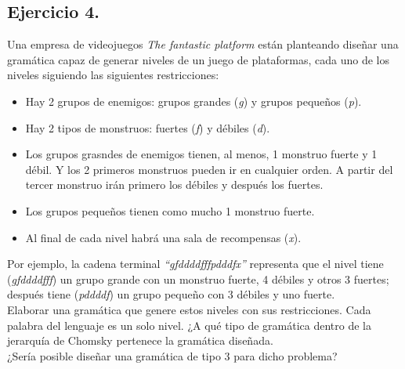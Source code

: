 \documentclass[11pt,a4paper]{article}
\begin{document}
\subsection{Ejercicio 4.} Una empresa de videojuegos \textit{The fantastic platform} están planteando diseñar una gramática capaz de generar niveles de un juego de plataformas, cada uno de los niveles siguiendo las siguientes restricciones:
	\begin{itemize}
		\item Hay 2 grupos de enemigos: grupos grandes (\textit{g}) y grupos pequeños (\textit{p}).
		\item Hay 2 tipos de monstruos: fuertes (\textit{f}) y débiles (\textit{d}).
		\item Los grupos grasndes de enemigos tienen, al menos, 1 monstruo fuerte y 1 débil. Y los 2 primeros monstruos pueden ir en cualquier orden. A partir del tercer monstruo irán primero los débiles y después los fuertes.
		\item Los grupos pequeños tienen como mucho 1 monstruo fuerte.
		\item Al final de cada nivel habrá una sala de recompensas (\textit{x}).
	\end{itemize}
	
Por ejemplo, la cadena terminal \textit{“gfddddfffpdddfx”} representa que el nivel tiene (\textit{gfddddfff}) un grupo grande con un monstruo fuerte, 4 débiles y otros 3 fuertes; después tiene (\textit{pddddf}) un grupo pequeño con 3 débiles y uno fuerte.\\

Elaborar una gramática que genere estos niveles con sus restricciones. Cada palabra del lenguaje es un solo nivel. ¿A qué tipo de gramática dentro de la jerarquía de Chomsky pertenece la gramática diseñada.\\

¿Sería posible diseñar una gramática de tipo 3 para dicho problema?
\end{document}
